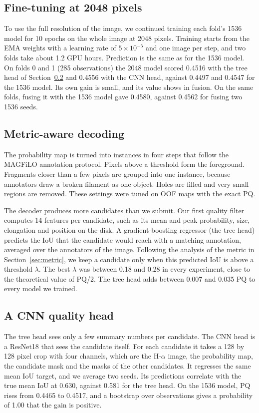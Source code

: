 \documentclass[sigconf]{acmart}
\begin{document}
\subsection{Fine-tuning at 2048 pixels}

To use the full resolution of the image, we continued training each fold's 1536 model for 10 epochs on the whole image at 2048 pixels. Training starts from the EMA weights with a learning rate of $5 \times 10^{-5}$ and one image per step, and two folds take about 1.2 GPU hours. Prediction is the same as for the 1536 model. On folds 0 and 1 (285 observations) the 2048 model scored 0.4516 with the tree head of Section~\ref{sec:decoding} and 0.4556 with the CNN head, against 0.4497 and 0.4547 for the 1536 model. Its own gain is small, and its value shows in fusion. On the same folds, fusing it with the 1536 model gave 0.4580, against 0.4562 for fusing two 1536 seeds.

\subsection{Metric-aware decoding}
\label{sec:decoding}

The probability map is turned into instances in four steps that follow the MAGFiLO annotation protocol. Pixels above a threshold form the foreground. Fragments closer than a few pixels are grouped into one instance, because annotators draw a broken filament as one object. Holes are filled and very small regions are removed. These settings were tuned on OOF maps with the exact PQ.

The decoder produces more candidates than we submit. Our first quality filter computes 14 features per candidate, such as its mean and peak probability, size, elongation and position on the disk. A gradient-boosting regressor (the tree head) predicts the IoU that the candidate would reach with a matching annotation, averaged over the annotators of the image. Following the analysis of the metric in Section~\ref{sec:metric}, we keep a candidate only when this predicted IoU is above a threshold $\lambda$. The best $\lambda$ was between 0.18 and 0.28 in every experiment, close to the theoretical value of PQ/2. The tree head adds between 0.007 and 0.035 PQ to every model we trained.

\subsection{A CNN quality head}

The tree head sees only a few summary numbers per candidate. The CNN head is a ResNet18 \cite{he2016resnet} that sees the candidate itself. For each candidate it takes a 128 by 128 pixel crop with four channels, which are the H-$\alpha$ image, the probability map, the candidate mask and the masks of the other candidates. It regresses the same mean IoU target, and we average two seeds. Its predictions correlate with the true mean IoU at 0.630, against 0.581 for the tree head. On the 1536 model, PQ rises from 0.4465 to 0.4517, and a bootstrap over observations gives a probability of 1.00 that the gain is positive.
\end{document}
